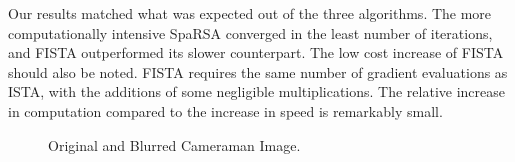\documentclass[10pt]{article} %
\begin{document}
Our results matched what was expected out of the three algorithms. The more computationally intensive SpaRSA converged in the least number of iterations, and FISTA outperformed its slower counterpart. The low cost increase of FISTA should also be noted. FISTA requires the same number of gradient evaluations as ISTA, with the additions of some negligible multiplications. The relative increase in computation compared to the increase in speed is remarkably small. 


\begin{figure}[H]
    \centering
    \caption{Original and Blurred Cameraman Image.}
    \label{fig:combined}
\end{figure}
\end{document}
